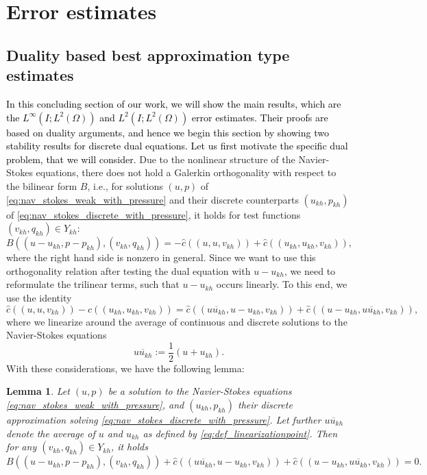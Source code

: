 \documentclass{m2an}
\newcommand\blue[1]{\textcolor{black}{#1}}
\newtheorem{lemma}[theorem]{Lemma}
\newcommand{\chatIO}[1]{\hat c \left(\!\left( #1 \right)\!\right)}
\newcommand{\uukh}{\overline{uu_{kh}}}
\newcommand{\Xkh}{Y_{kh}}
\newcommand{\ukh}{u_{kh}}
\newcommand{\vkh}{v_{kh}}
\newcommand{\pkh}{p_{kh}}
\newcommand{\qkh}{q_{kh}}
\begin{document}
\section{Error estimates}\label{sec:ErrEst}
\subsection{Duality based best approximation type estimates}
\blue{In this concluding section of our work, we will show the main results, which are the 
  $L^\infty(I;L^2(\Omega))$ and $L^2(I;L^2(\Omega))$ error estimates. Their proofs are based 
  on duality arguments, and hence we begin this section by showing two stability results for 
  discrete dual equations. Let us first motivate the specific dual problem, that we will consider.}
Due to the nonlinear structure of the Navier-Stokes equations, there does not hold a Galerkin orthogonality
with respect to the bilinear form $B$, i.e.,
for solutions $(u,p)$ of \eqref{eq:nav_stokes_weak_with_pressure} and their discrete counterparts
$(\ukh,\pkh)$ of \eqref{eq:nav_stokes_discrete_with_pressure}, it holds for test functions 
$(\vkh,\qkh) \in \Xkh$:
\begin{equation*}
  B((u-\ukh,p-\pkh),(\vkh,\qkh)) = - \chatIO{u,u,\vkh} + \chatIO{\ukh,\ukh,\vkh},
\end{equation*}
where the right hand side is nonzero in general.
Since we want to use this orthogonality relation after testing the dual equation with $u-\ukh$,
we need to reformulate the trilinear terms, such that $u-\ukh$ occurs linearly.
To this end, we use the identity
\begin{equation}\label{eq:linearize_nav_stokes}
  \chatIO{u,u,\vkh} - \chatIO{\ukh,\ukh,\vkh}
  = \chatIO{\uukh,u-\ukh,\vkh} + \chatIO{u-\ukh,\uukh,\vkh},
\end{equation}
where we linearize around the average of continuous and discrete solutions to the Navier-Stokes 
equations
\begin{equation}\label{eq:def_linearizationpoint}
  \uukh := \frac{1}{2} (u + \ukh).
\end{equation}
With these considerations, we have the following lemma:
\begin{lemma}\label{lemm:Galerkin_orth}
  Let $(u,p)$ be a solution to the Navier-Stokes equations \eqref{eq:nav_stokes_weak_with_pressure},
  and $(\ukh,\pkh)$ their discrete approximation solving \eqref{eq:nav_stokes_discrete_with_pressure}.
  Let further $\uukh$ denote the average of $u$ and $\ukh$ as defined by \eqref{eq:def_linearizationpoint}.
  Then for any $(\vkh,\qkh)\in \Xkh$, it holds
\begin{equation*}
  B((u-\ukh,p-\pkh),(\vkh,\qkh)) + \chatIO{\uukh,u-\ukh,\vkh} + \chatIO{u-\ukh,\uukh,\vkh} = 0.
\end{equation*}
\end{lemma}
\end{document}
